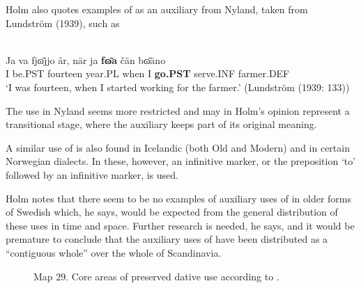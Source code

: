 

Holm also quotes examples of  as an auxiliary from Nyland, taken from Lundström (1939), such as



\ea\label{}
\\
\gll Ja  va  fj\={ɷ}jjo   år,  när  ja  \textbf{f\={ɷ}a} čän  b\={ɷ}äno   \\
I  be.PST  fourteen  year.PL  when  I  \textbf{go.PST} serve.INF  farmer.DEF  \\
\glt ‘I was fourteen, when I started working for the farmer.’ (Lundström (1939: 133))
\z

The use in Nyland seems more restricted and may in Holm’s opinion represent a transitional stage, where the auxiliary keeps part of its original meaning. 



A similar use of  is also found in Icelandic (both Old and Modern) and in certain Norwegian dialects. In these, however, an infinitive marker, or the preposition  ‘to’ followed by an infinitive marker, is used. 




Holm notes that there seem to be no examples of auxiliary uses of  in older forms of Swedish which, he says, would be expected from the general distribution of these uses in time and space. Further research is needed, he says, and it would be premature to conclude that the auxiliary uses of  have been distributed as a “contiguous whole” over the whole of Scandinavia.







\begin{figure}[h]

\begin{minipage}{6.53125in}

\label{bkm:Ref134863405}Map 29. Core areas of preserved dative use according to \citet{Reinhammar1973}.


\end{minipage}

\end{figure}


